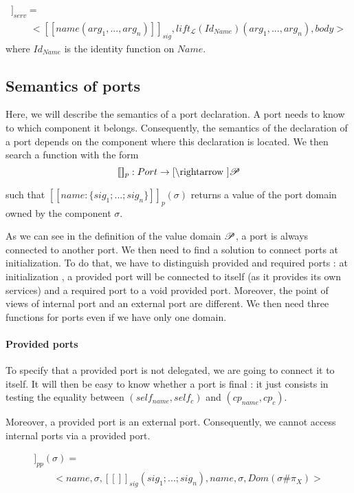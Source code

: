\begin{multline*}
[\![\textbf{service}~name(arg_1,...,arg_n)\{
	body
	\}
]\!]_{serv}=\\
\qquad  <[\![name(arg_1,...,arg_n)]\!]_{sig}, lift_{\mathcal{L}}(Id_{Name})(arg_1,...,arg_n), body>
\end{multline*}
where $Id_{Name}$ is the identity function on $Name$.
\subsection{Semantics of ports}
Here, we will describe the semantics of a port declaration. A port needs to know to which component it belongs. Consequently, the semantics of the declaration of a port depends on the component where this declaration is located. We then search a function with the form
\[[\![]\!]_{p} : Port \rightarrow \Cref \rightarrow \Po\]

such that $[\![name:\{sig_1; ... ; sig_n\}]\!]_{p}(\sigma)$ returns a value of the port domain owned by the component $\sigma$.

As we can see in the definition of the value domain $\mathcal{P}$, a port is always connected to another port. We then need to find a solution to connect ports at initialization. To do that, we have to distinguish provided and required ports : at initialization , a provided port will be connected to itself (as it provides its own services) and a required port to a void provided port. Moreover, the point of views of internal port and an external port are different. We then need three functions for ports even if we have only one domain.

\paragraph{Provided ports} 
To specify that a provided port is not delegated, we are going to connect it to itself. It will then be easy to know whether a port is final : it just consists in testing the equality between $(self_{name}, self_c)$ and $(cp_{name}, cp_c)$.

Moreover, a provided port is an external port. Consequently, we cannot access internal ports via a provided port.

\begin{multline*}
[\![name:\{sig_1; ... ; sig_n\}]\!]_{pp}(\sigma) = \\
\qquad <name,\sigma,[\![]\!]_{sig}(sig_1; ... ; sig_n), name, \sigma, Dom(\sigma\#\pi_X) >
\end{multline*}


